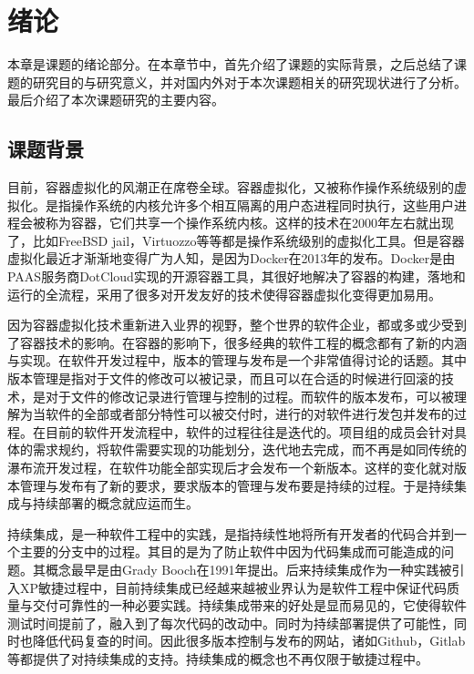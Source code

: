 
\chapter{绪论}
\label{chap:intro}

本章是课题的绪论部分。在本章节中，首先介绍了课题的实际背景，之后总结了课题的研究目的与研究意义，并对国内外对于本次课题相关的研究现状进行了分析。最后介绍了本次课题研究的主要内容。

\section{课题背景}

目前，容器虚拟化的风潮正在席卷全球。容器虚拟化，又被称作操作系统级别的虚拟化。是指操作系统的内核允许多个相互隔离的用户态进程同时执行，这些用户进程会被称为容器，它们共享一个操作系统内核。这样的技术在2000年左右就出现了，比如FreeBSD jail，Virtuozzo等等都是操作系统级别的虚拟化工具。但是容器虚拟化最近才渐渐地变得广为人知，是因为Docker在2013年的发布。Docker是由PAAS服务商DotCloud实现的开源容器工具，其很好地解决了容器的构建，落地和运行的全流程，采用了很多对开发友好的技术使得容器虚拟化变得更加易用。

因为容器虚拟化技术重新进入业界的视野，整个世界的软件企业，都或多或少受到了容器技术的影响。在容器的影响下，很多经典的软件工程的概念都有了新的内涵与实现。在软件开发过程中，版本的管理与发布是一个非常值得讨论的话题。其中版本管理是指对于文件的修改可以被记录，而且可以在合适的时候进行回滚的技术，是对于文件的修改记录进行管理与控制的过程。而软件的版本发布，可以被理解为当软件的全部或者部分特性可以被交付时，进行的对软件进行发包并发布的过程。在目前的软件开发流程中，软件的过程往往是迭代的。项目组的成员会针对具体的需求规约，将软件需要实现的功能划分，迭代地去完成，而不再是如同传统的瀑布流开发过程，在软件功能全部实现后才会发布一个新版本。这样的变化就对版本管理与发布有了新的要求，要求版本的管理与发布要是持续的过程。于是持续集成与持续部署的概念就应运而生。

持续集成，是一种软件工程中的实践，是指持续性地将所有开发者的代码合并到一个主要的分支中的过程。其目的是为了防止软件中因为代码集成而可能造成的问题。其概念最早是由Grady Booch在1991年提出。\cite{Booch}后来持续集成作为一种实践被引入XP敏捷过程中，目前持续集成已经越来越被业界认为是软件工程中保证代码质量与交付可靠性的一种必要实践。持续集成带来的好处是显而易见的，它使得软件测试时间提前了，融入到了每次代码的改动中。同时为持续部署提供了可能性，同时也降低代码复查的时间。因此很多版本控制与发布的网站，诸如Github，Gitlab等都提供了对持续集成的支持。持续集成的概念也不再仅限于敏捷过程中。

